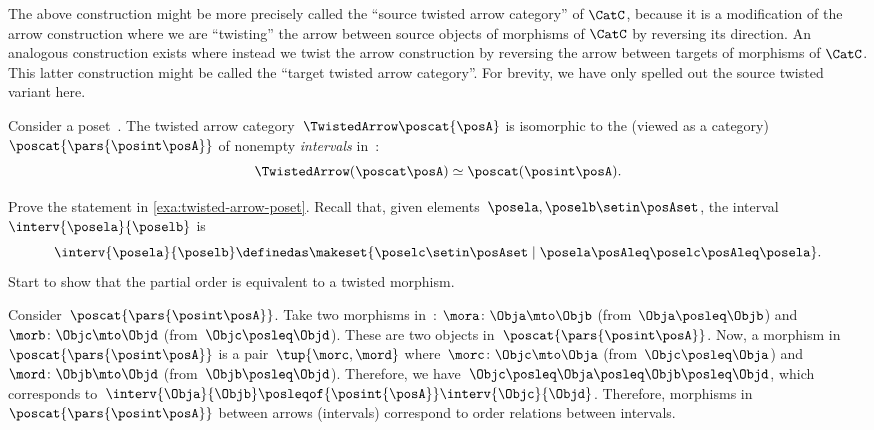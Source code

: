 \begin{remark}
    The above construction might be more precisely called the ``source twisted arrow category'' of $\CatC$, because it is a modification of the arrow construction where we are ``twisting'' the arrow between source objects of morphisms of $\CatC$ by reversing its direction.
    An analogous construction exists where instead we twist the arrow construction by reversing the arrow between targets of morphisms of $\CatC$.
    This latter construction might be called the ``target twisted arrow category''.
    For brevity, we have only spelled out the source twisted variant here.
\end{remark}

\begin{example}
    \label{exa:twisted-arrow-poset}
    Consider a poset~\posA.
    The twisted arrow category~$\TwistedArrow \poscat{\posA}$ is isomorphic to the  (viewed as a category)~$\poscat{\pars{\posint\posA}}$ of nonempty \emph{intervals} in~\posA:
    \begin{equation}
        \TwistedArrow (\poscat \posA) \simeq \poscat (\posint\posA) .
    \end{equation}
\end{example}

\begin{exercise}
    Prove the statement in \cref{exa:twisted-arrow-poset}.
    Recall that, given elements~$\posela, \poselb \setin \posAset$, the interval~$\interv{\posela}{\poselb}$ is
    \begin{equation}
        \interv{\posela}{\poselb}
        \definedas \makeset{\poselc \setin \posAset \mid \posela\posAleq \poselc \posAleq \posela}.
    \end{equation}
    Start to show that the partial order is equivalent to a twisted morphism.
\end{exercise}
\begin{solution}
    Consider~$\poscat{\pars{\posint\posA}}$.
    Take two morphisms in~\posA: $\mora\colon \Obja \mto \Objb$ (from~$\Obja \posleq \Objb$) and $\morb\colon \Objc\mto \Objd$ (from~$\Objc \posleq \Objd$).
    These are two objects in~$\poscat{\pars{\posint\posA}}$.
    Now, a morphism in~$\poscat{\pars{\posint\posA}}$ is a pair~$\tup{\morc,\mord}$ where~$\morc\colon \Objc \mto \Obja$ (from~$\Objc\posleq \Obja$) and~$\mord\colon \Objb \mto \Objd$ (from~$\Objb\posleq \Objd$).
    Therefore, we have~$\Objc\posleq \Obja\posleq \Objb\posleq \Objd$, which corresponds to~$\interv{\Obja}{\Objb}\posleqof{\posint{\posA}}\interv{\Objc}{\Objd}$.
    Therefore, morphisms in~$\poscat{\pars{\posint\posA}}$ between arrows (intervals) correspond to order relations between intervals.
\end{solution}

